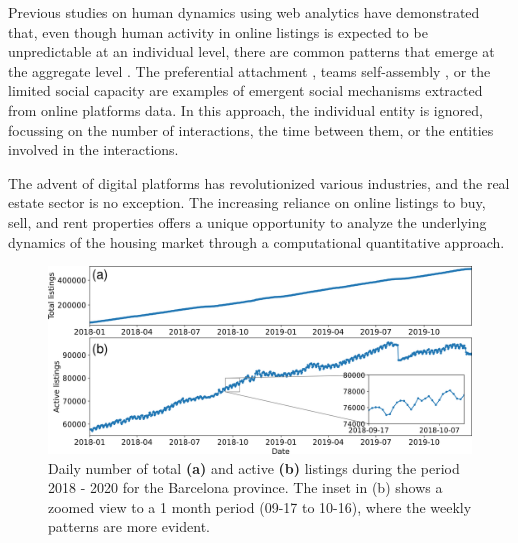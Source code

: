 Previous studies on human dynamics using web analytics have demonstrated that, even though human activity in online listings is expected to be unpredictable at an individual level, there are common patterns that emerge at the aggregate level \cite{Lazer2009CompSocSci}. The preferential attachment \cite{barabasi1999emergence,goncalves-2008}, teams self-assembly \cite{guimera-2005}, or the limited social capacity \cite{goncalves-2011,dunbar-2012} are examples of emergent social mechanisms extracted from online platforms data. In this approach, the individual entity is ignored, focussing on the number of interactions, the time between them, or the entities involved in the interactions.

The advent of digital platforms has revolutionized various industries, and the real estate sector is no exception. The increasing reliance on online listings to buy, sell, and rent properties offers a unique opportunity to analyze the underlying dynamics of the housing market through a computational quantitative approach. 


\begin{figure}
    \vspace{0.2 cm}
    \centering
    \includegraphics[width =\textwidth]{Figs/Idealista_dynamics/adds_evo.pdf}
	\caption[Active listings evolution.]{\label{fig:active_adds} Daily number of total \textbf{(a)} and active \textbf{(b)} listings during the period 2018 - 2020 for the Barcelona province. The inset in (b) shows a zoomed view to a 1 month period (09-17 to 10-16), where the weekly patterns are more evident.}
\end{figure}

